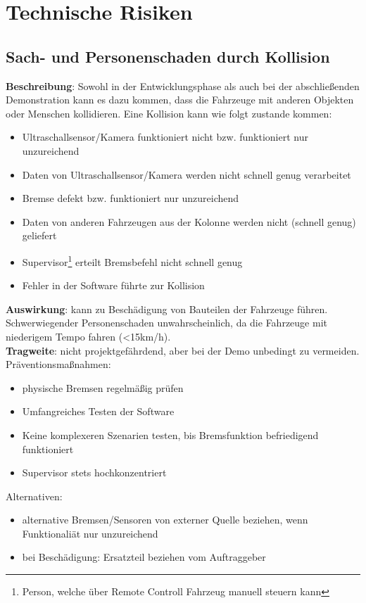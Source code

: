 \documentclass[a4paper, 12pt, titlepage]{scrartcl}
\begin{document}
	
\newpage
\section{Technische Risiken}
	\subsection{Sach- und Personenschaden durch Kollision}
		\textbf{Beschreibung}: Sowohl in der Entwicklungsphase als auch bei der abschlie\ss enden Demonstration kann es dazu kommen, dass die Fahrzeuge mit anderen Objekten oder Menschen kollidieren. Eine Kollision kann wie folgt zustande kommen: 
			\begin{itemize}
				\item Ultraschallsensor/Kamera funktioniert nicht bzw. funktioniert nur unzureichend
				\item Daten von Ultraschallsensor/Kamera werden nicht schnell genug verarbeitet
				\item Bremse defekt bzw. funktioniert nur unzureichend
				\item Daten von anderen Fahrzeugen aus der Kolonne werden nicht (schnell genug) geliefert
				\item Supervisor\footnote{Person, welche \"uber Remote Controll Fahrzeug manuell steuern kann} erteilt Bremsbefehl nicht schnell genug
				\item Fehler in der Software f\"uhrte zur Kollision
			\end{itemize}
		\textbf{Auswirkung}: kann zu Besch\"adigung von Bauteilen der Fahrzeuge f\"uhren. Schwerwiegender Personenschaden unwahrscheinlich, da die Fahrzeuge mit niederigem Tempo fahren (<15km/h).\\
		\textbf{Tragweite}: nicht projektgef\"ahrdend, aber bei der Demo unbedingt zu vermeiden.\\
		Pr\"aventionsma\ss nahmen:
			\begin{itemize}
				\item physische Bremsen regelm\"a\ss ig pr\"ufen
				\item Umfangreiches Testen der Software
				\item Keine komplexeren Szenarien testen, bis Bremsfunktion befriedigend funktioniert
				\item Supervisor stets hochkonzentriert 
			\end{itemize}
		Alternativen: 
			\begin{itemize}
				\item alternative Bremsen/Sensoren von externer Quelle beziehen, wenn Funktionali\"at nur unzureichend
				\item bei Besch\"adigung: Ersatzteil beziehen vom Auftraggeber
			\end{itemize}
		
\end{document}
